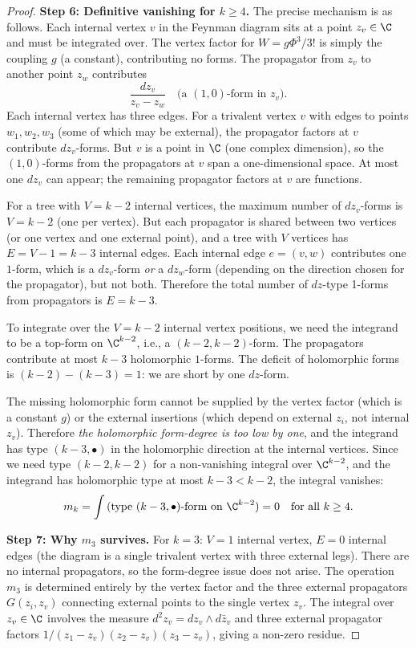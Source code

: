 \begin{proof}
\textbf{Step 6: Definitive vanishing for $k \geq 4$.}
The precise mechanism is as follows. Each internal vertex $v$ in the Feynman diagram sits at a point $z_v \in \C$ and must be integrated over. The vertex factor for $W = g\Phi^3/3!$ is simply the coupling $g$ (a constant), contributing no forms. The propagator from $z_v$ to another point $z_w$ contributes
\[
\frac{dz_v}{z_v - z_w} \quad \text{(a $(1,0)$-form in $z_v$)}.
\]
Each internal vertex has three edges. For a trivalent vertex $v$ with edges to points $w_1, w_2, w_3$ (some of which may be external), the propagator factors at $v$ contribute $dz_v$-forms. But $v$ is a point in $\C$ (one complex dimension), so the $(1,0)$-forms from the propagators at $v$ span a one-dimensional space. At most one $dz_v$ can appear; the remaining propagator factors at $v$ are functions.

For a tree with $V = k-2$ internal vertices, the maximum number of $dz_v$-forms is $V = k-2$ (one per vertex). But each propagator is shared between two vertices (or one vertex and one external point), and a tree with $V$ vertices has $E = V - 1 = k - 3$ internal edges. Each internal edge $e = (v, w)$ contributes one $1$-form, which is a $dz_v$-form \emph{or} a $dz_w$-form (depending on the direction chosen for the propagator), but not both. Therefore the total number of $dz$-type 1-forms from propagators is $E = k - 3$.

To integrate over the $V = k - 2$ internal vertex positions, we need the integrand to be a top-form on $\C^{k-2}$, i.e., a $(k-2, k-2)$-form. The propagators contribute at most $k-3$ holomorphic $1$-forms. The deficit of holomorphic forms is $(k-2) - (k-3) = 1$: we are short by one $dz$-form.

The missing holomorphic form cannot be supplied by the vertex factor (which is a constant $g$) or the external insertions (which depend on external $z_i$, not internal $z_v$). Therefore \emph{the holomorphic form-degree is too low by one}, and the integrand has type $(k-3, \bullet)$ in the holomorphic direction at the internal vertices. Since we need type $(k-2, k-2)$ for a non-vanishing integral over $\C^{k-2}$, and the integrand has holomorphic type at most $k-3 < k-2$, the integral vanishes:
\[
m_k = \int \text{(type $(k-3,\bullet)$-form on $\C^{k-2}$)} = 0 \quad \text{for all } k \geq 4.
\]

\textbf{Step 7: Why $m_3$ survives.}
For $k = 3$: $V = 1$ internal vertex, $E = 0$ internal edges (the diagram is a single trivalent vertex with three external legs). There are no internal propagators, so the form-degree issue does not arise. The operation $m_3$ is determined entirely by the vertex factor and the three external propagators $G(z_i, z_v)$ connecting external points to the single vertex $z_v$. The integral over $z_v \in \C$ involves the measure $d^2z_v = dz_v \wedge d\bar{z}_v$ and three external propagator factors $1/(z_1 - z_v)(z_2 - z_v)(z_3 - z_v)$, giving a non-zero residue.


\end{proof}
